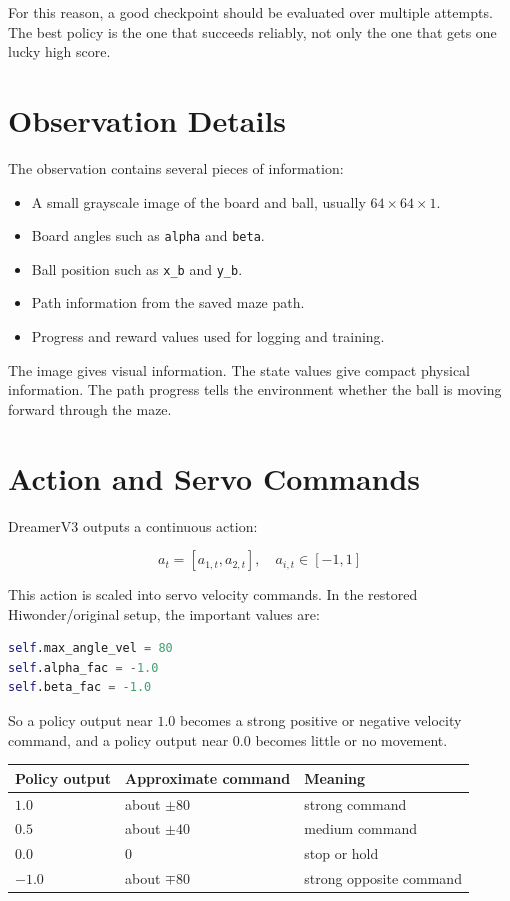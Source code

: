 \documentclass[11pt]{article}
\begin{document}
For this reason, a good checkpoint should be evaluated over multiple attempts. The best policy is the one that succeeds reliably, not only the one that gets one lucky high score.

\section{Observation Details}

The observation contains several pieces of information:

\begin{itemize}[leftmargin=*]
  \item A small grayscale image of the board and ball, usually $64 \times 64 \times 1$.
  \item Board angles such as \texttt{alpha} and \texttt{beta}.
  \item Ball position such as \texttt{x\_b} and \texttt{y\_b}.
  \item Path information from the saved maze path.
  \item Progress and reward values used for logging and training.
\end{itemize}

The image gives visual information. The state values give compact physical information. The path progress tells the environment whether the ball is moving forward through the maze.

\section{Action and Servo Commands}

DreamerV3 outputs a continuous action:

\begin{equation}
a_t = [a_{1,t}, a_{2,t}], \quad a_{i,t} \in [-1, 1]
\end{equation}

This action is scaled into servo velocity commands. In the restored Hiwonder/original setup, the important values are:

\begin{lstlisting}[language=Python]
self.max_angle_vel = 80
self.alpha_fac = -1.0
self.beta_fac = -1.0
\end{lstlisting}

So a policy output near $1.0$ becomes a strong positive or negative velocity command, and a policy output near $0.0$ becomes little or no movement.

\begin{center}
\begin{tabular}{lll}
\toprule
Policy output & Approximate command & Meaning \\
\midrule
$1.0$ & about $\pm 80$ & strong command \\
$0.5$ & about $\pm 40$ & medium command \\
$0.0$ & $0$ & stop or hold \\
$-1.0$ & about $\mp 80$ & strong opposite command \\
\bottomrule
\end{tabular}
\end{center}
\end{document}

